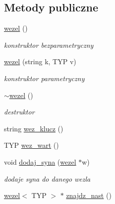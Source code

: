 \subsection*{\-Metody publiczne}
\begin{DoxyCompactItemize}
\item 
\hyperlink{classwezel_aa6eb4023b2cdc882869319045e3c440c}{wezel} ()
\begin{DoxyCompactList}\small\item\em konstruktor bezparametryczny \end{DoxyCompactList}\item 
\hyperlink{classwezel_aa3ce16f9db7f22de8c8e5869f956a35c}{wezel} (string k, \-T\-Y\-P v)
\begin{DoxyCompactList}\small\item\em konstruktor parametryczny \end{DoxyCompactList}\item 
\hyperlink{classwezel_a968f2a16240584139740af96640be730}{$\sim$wezel} ()
\begin{DoxyCompactList}\small\item\em destruktor \end{DoxyCompactList}\item 
string \hyperlink{classwezel_a2d01a9345190a1e1a5988802465da07e}{wez\-\_\-klucz} ()
\item 
\-T\-Y\-P \hyperlink{classwezel_a92d30ad2053c6146ccb6984b0049d2d9}{wez\-\_\-wart} ()
\item 
void \hyperlink{classwezel_ae0b0c58bee96c0ca205549a69d7197a7}{dodaj\-\_\-syna} (\hyperlink{classwezel}{wezel} $\ast$w)
\begin{DoxyCompactList}\small\item\em dodaje syna do danego wezla \end{DoxyCompactList}\item 
\hyperlink{classwezel}{wezel}$<$ \-T\-Y\-P $>$ $\ast$ \hyperlink{classwezel_a4c9fdab031ecfd4c4a99e78752930d13}{znajdz\-\_\-nast} ()
\end{DoxyCompactItemize}
